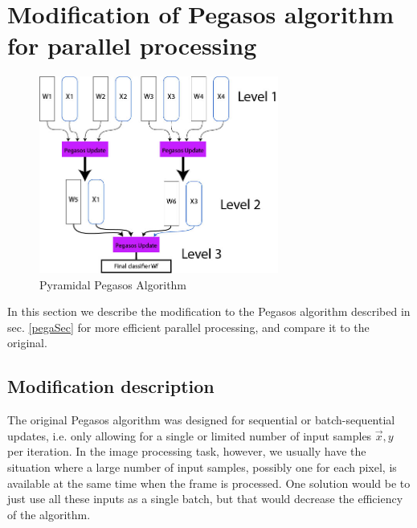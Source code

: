 \section{Modification of Pegasos algorithm for parallel processing}
\begin{figure}[t]
		\centering
		\includegraphics[width=0.7\textwidth]{pyrapega}
		\caption{Pyramidal Pegasos Algorithm}
		\label{pyra}
	\end{figure}
In this section we describe the modification to the Pegasos algorithm described in sec. \ref{pegaSec} for more efficient parallel processing, and compare it to the original.
\subsection{Modification description}
The original Pegasos algorithm was designed for sequential or batch-sequential updates, i.e. only allowing for a single or limited number of input samples $\vec{x},y$ per iteration. In the image processing task, however, we usually have the situation where a large number of input samples, possibly one for each pixel, is available at the same time when the frame is processed. One solution would be to just use all these inputs as a single batch, but that would decrease the efficiency of the algorithm.

